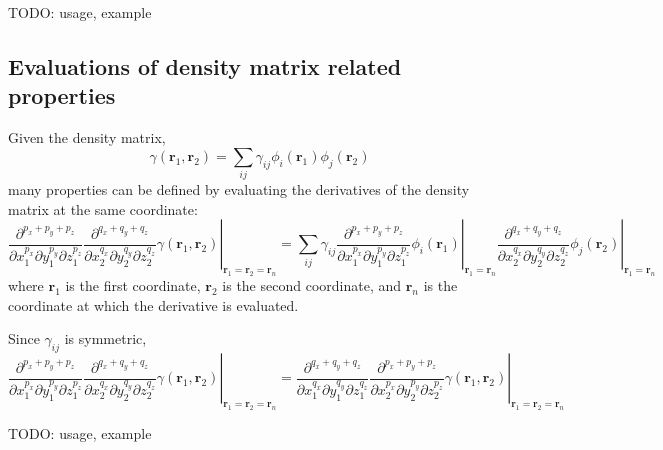 \documentclass[letterpaper]{article}
\begin{document}
TODO: usage, example
\subsection{Evaluations of density matrix related properties}
Given the density matrix,
\begin{equation}
  \gamma(\mathbf{r}_1, \mathbf{r}_2)
  = \sum_{ij} \gamma_{ij} \phi_i(\mathbf{r}_1) \phi_j(\mathbf{r}_2)
\end{equation}
many properties can be defined by evaluating the derivatives of the density
matrix at the same coordinate:
\begin{equation}
  \left.
    \frac{\partial^{p_x + p_y + p_z}}{\partial x_1^{p_x} \partial y_1^{p_y} \partial z_1^{p_z}}
    \frac{\partial^{q_x + q_y + q_z}}{\partial x_2^{q_x} \partial y_2^{q_y} \partial z_2^{q_z}}
    \gamma(\mathbf{r}_1, \mathbf{r}_2)
  \right|_{\mathbf{r}_1 = \mathbf{r}_2 = \mathbf{r}_n} =
  \sum_{ij} \gamma_{ij}
  \left.
    \frac{\partial^{p_x + p_y + p_z}}{\partial x_1^{p_x} \partial y_1^{p_y} \partial z_1^{p_z}}
    \phi_i(\mathbf{r}_1)
  \right|_{\mathbf{r}_1 = \mathbf{r}_n}
  \left.
    \frac{\partial^{q_x + q_y + q_z}}{\partial x_2^{q_x} \partial y_2^{q_y} \partial z_2^{q_z}}
    \phi_j(\mathbf{r}_2)
  \right|_{\mathbf{r}_1 = \mathbf{r}_n}
\end{equation}
where $\mathbf{r}_1$ is the first coordinate, $\mathbf{r}_2$ is the second
coordinate, and $\mathbf{r}_n$ is the coordinate at which the derivative is
evaluated.

Since $\gamma_{ij}$ is symmetric,
\begin{equation}
  \left.
    \frac{\partial^{p_x + p_y + p_z}}{\partial x_1^{p_x} \partial y_1^{p_y} \partial z_1^{p_z}}
    \frac{\partial^{q_x + q_y + q_z}}{\partial x_2^{q_x} \partial y_2^{q_y} \partial z_2^{q_z}}
    \gamma(\mathbf{r}_1, \mathbf{r}_2)
  \right|_{\mathbf{r}_1 = \mathbf{r}_2 = \mathbf{r}_n} =
  \left.
    \frac{\partial^{q_x + q_y + q_z}}{\partial x_1^{q_x} \partial y_1^{q_y} \partial z_1^{q_z}}
    \frac{\partial^{p_x + p_y + p_z}}{\partial x_2^{p_x} \partial y_2^{p_y} \partial z_2^{p_z}}
    \gamma(\mathbf{r}_1, \mathbf{r}_2)
  \right|_{\mathbf{r}_1 = \mathbf{r}_2 = \mathbf{r}_n}
\end{equation}

TODO: usage, example
\end{document}
